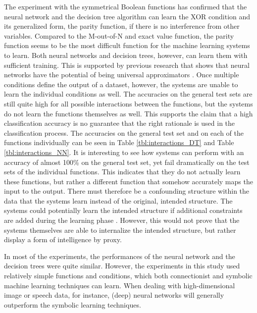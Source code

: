 \documentclass[letterpaper]{article} %
\begin{document}
The experiment with the symmetrical Boolean functions has confirmed that the neural network and the decision tree algorithm can learn the XOR condition and its generalized form, the parity function, if there is no interference from other variables. Compared to the M-out-of-N and exact value function, the parity function seems to be the most difficult function for the machine learning systems to learn. Both neural networks and decision trees, however, can learn them with sufficient training. This is supported by previous research that shows that neural networks have the potential of being universal approximators \cite{hornik1991approximation}. Once multiple conditions define the output of a dataset, however, the systems are unable to learn the individual conditions as well. The accuracies on the general test sets are still quite high for all possible interactions between the functions, but the systems do not learn the functions themselves as well. This supports the claim that a high classification accuracy is no guarantee that the right rationale is used in the classification process. The accuracies on the general test set and on each of the functions individually can be seen in Table \ref{tbl:interactions_DT} and Table \ref{tbl:interactions_NN}. It is interesting to see how systems can perform with an accuracy of almost 100\% on the general test set, yet fail dramatically on the test sets of the individual functions. This indicates that they do not actually learn these functions, but rather a different function that somehow accurately maps the input to the output. There must therefore be a confounding structure within the data that the systems learn instead of the original, intended structure. The systems could potentially learn the intended structure if additional constraints are added during the learning phase  \cite{schwab2012learn}. However, this would not prove that the systems themselves are able to internalize the intended structure, but rather display a form of intelligence by proxy.


In most of the experiments, the performances of the neural network and the decision trees were quite similar. %
However, the experiments in this study used relatively simple functions and conditions, which both connectionist and symbolic machine learning techniques can learn. When dealing with high-dimensional image or speech data, for instance, (deep) neural networks will generally outperform the symbolic learning techniques. %
\end{document}
